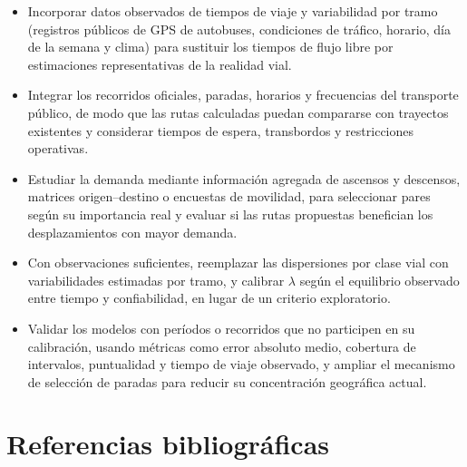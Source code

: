 \documentclass[11pt]{article}
\numberwithin{equation}{section}
\begin{document}
\begin{itemize}
    \item Incorporar datos observados de tiempos de viaje y variabilidad por tramo (registros públicos de GPS de autobuses, condiciones de tráfico, horario, día de la semana y clima) para sustituir los tiempos de flujo libre por estimaciones representativas de la realidad vial.
    \item Integrar los recorridos oficiales, paradas, horarios y frecuencias del transporte público, de modo que las rutas calculadas puedan compararse con trayectos existentes y considerar tiempos de espera, transbordos y restricciones operativas.
    \item Estudiar la demanda mediante información agregada de ascensos y descensos, matrices origen--destino o encuestas de movilidad, para seleccionar pares según su importancia real y evaluar si las rutas propuestas benefician los desplazamientos con mayor demanda.
    \item Con observaciones suficientes, reemplazar las dispersiones por clase vial con variabilidades estimadas por tramo, y calibrar $\lambda$ según el equilibrio observado entre tiempo y confiabilidad, en lugar de un criterio exploratorio.
    \item Validar los modelos con períodos o recorridos que no participen en su calibración, usando métricas como error absoluto medio, cobertura de intervalos, puntualidad y tiempo de viaje observado, y ampliar el mecanismo de selección de paradas para reducir su concentración geográfica actual.
\end{itemize}

\section*{Referencias bibliográficas}
\label{sec:referencias}
\end{document}
